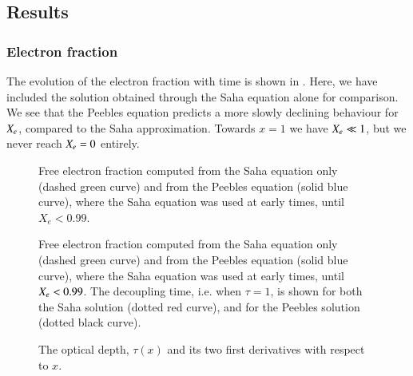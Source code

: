 \subsection{Results}\label{ssec:M2:results}


\subsubsection{Electron fraction} \label{sssec:M2:results:electron_fraction}
The evolution of the electron fraction  with time is shown in . Here, we have included the solution obtained through the Saha equation alone for comparison. We see that the Peebles equation predicts a more slowly declining behaviour for $X_e$, compared to the Saha approximation. Towards $x=1$ we have $X_e\ll1$, but we never reach $X_e=0$ entirely. 


\begin{figure}[ht!]
    \caption{Free electron fraction computed from the Saha equation only (dashed green curve) and from the Peebles equation (solid blue curve), where the Saha equation was used at early times, until $X_e<0.99$.}
    \label{fig:M2:results:compare_Xe_peebles_saha}
\end{figure}

\begin{figure}[ht!]
    \caption{Free electron fraction computed from the Saha equation only (dashed green curve) and from the Peebles equation (solid blue curve), where the Saha equation was used at early times, until $X_e<0.99$. The decoupling time, i.e. when $\tau=1$, is shown for both the Saha solution (dotted red curve), and for the Peebles solution (dotted black curve).}
    \label{fig:M2:results:decoupling_compare_Xe_peebles_saha}
\end{figure}

\begin{figure}[ht!]
    \caption{The optical depth, $\tau(x)$ and its two first derivatives with respect to $x$.}
    \label{fig:M2:results:tau_plot}
\end{figure}


